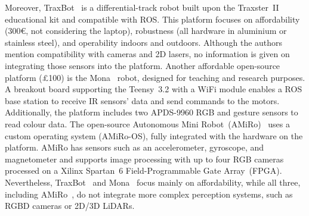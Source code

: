 \documentclass[letterpaper,10pt,conference]{IEEEtran} %
\begin{document}
Moreover, TraxBot~\cite{araujo2012icaart} is a differential-track robot
built upon the Traxster~II educational kit and compatible with ROS.
This platform focuses on affordability (300€, not considering the laptop),
robustness (all hardware in aluminium or stainless steel),
and operability indoors and outdoors.
Although the authors mention compatibility with cameras and 2D lasers,
no information is given on integrating those sensors into the platform.
Another affordable open-source platform (\pounds100) is the
Mona~\cite{arvin2019jint} robot,
designed for teaching and research purposes.
A breakout board supporting the Teensy~3.2 with a WiFi module
enables a ROS base station to receive IR sensors' data and
send commands to the motors.
Additionally, the platform includes two APDS-9960 RGB and
gesture sensors to read colour data.
The open-source Autonomous Mini Robot~(AMiRo)~\cite{herbrechtsmeier2016icstcc}
uses a custom operating system (AMiRo-OS),
fully integrated with the hardware on the platform.
AMiRo has sensors such as an accelerometer, gyroscope, and magnetometer
and supports image processing with up to four RGB cameras
processed on a Xilinx Spartan~6
Field-Programmable Gate Array~(FPGA).
Nevertheless, TraxBot~\cite{araujo2012icaart} and Mona~\cite{arvin2019jint}
focus mainly on affordability, while all three,
including AMiRo~\cite{herbrechtsmeier2016icstcc},
do not integrate more complex perception systems,
such as RGBD cameras or 2D/3D LiDARs.
\end{document}

